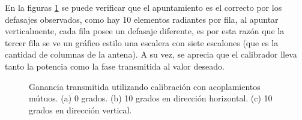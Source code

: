 En la figuras \ref{fig:nonErrMutual} se puede verificar que el apuntamiento es el correcto por los defasajes observados, como 
hay 10 elementos radiantes por fila, al apuntar verticalmente, cada fila posee un defasaje diferente, es por esta razón que la
tercer fila se ve un gráfico estilo una escalera con siete escalones (que es la cantidad de columnas de la antena). A su vez, 
se aprecia que el calibrador lleva tanto la potencia como la fase transmitida al valor deseado.
\begin{figure}[H]
	\centering
 	
		\caption{Ganancia transmitida utilizando calibración con acoplamientos mútuos. (a) 0 grados. (b) 10 grados en 
		dirección horizontal. (c) 10 grados en dirección vertical.}
	\label{fig:nonErrMutual}
\end{figure}

